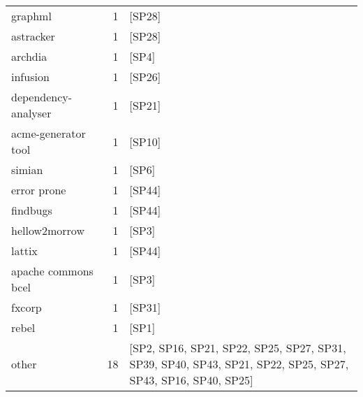 \begin{tabular}{lrl}
             graphml &      1 &                                                                                                       [SP28] \\
           astracker &      1 &                                                                                                       [SP28] \\
             archdia &      1 &                                                                                                        [SP4] \\
            infusion &      1 &                                                                                                       [SP26] \\
 dependency-analyser &      1 &                                                                                                       [SP21] \\
 acme-generator tool &      1 &                                                                                                       [SP10] \\
              simian &      1 &                                                                                                        [SP6] \\
         error prone &      1 &                                                                                                       [SP44] \\
            findbugs &      1 &                                                                                                       [SP44] \\
       hellow2morrow &      1 &                                                                                                        [SP3] \\
              lattix &      1 &                                                                                                       [SP44] \\
 apache commons bcel &      1 &                                                                                                        [SP3] \\
              fxcorp &      1 &                                                                                                       [SP31] \\
               rebel &      1 &                                                                                                        [SP1] \\
               other &     18 &  [SP2, SP16, SP21, SP22, SP25, SP27, SP31, SP39, SP40, SP43, SP21, SP22, SP25, SP27, SP43, SP16, SP40, SP25] \\
\bottomrule
\end{tabular}
